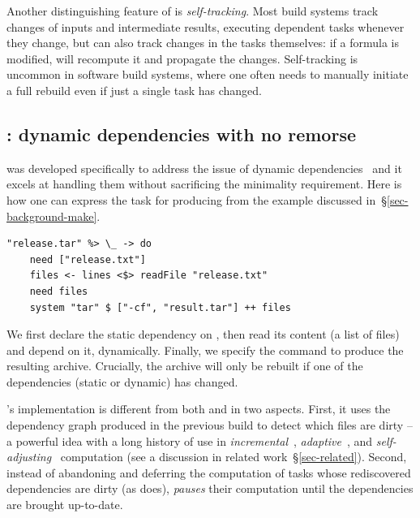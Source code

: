 Another distinguishing feature of \Excel is \emph{self-tracking}. Most build
systems track changes of inputs and intermediate results, executing dependent
tasks whenever they change, but \Excel can also track changes in the tasks
themselves: if a formula is modified, \Excel will recompute it and propagate
the changes. Self-tracking is uncommon in software build systems, where one
often needs to manually initiate a full rebuild even if just a single task has
changed.

\subsection{\Shake: dynamic dependencies with no remorse}
\label{sec-background-shake}

\Shake was developed specifically to address the issue of dynamic
dependencies~\cite{mitchell2012shake} and it excels at handling them without
sacrificing the minimality requirement. Here is how one can express the task
for producing  from the example discussed
in~\S\ref{sec-background-make}.

\vspace{1mm}
\begin{verbatim}
"release.tar" %> \_ -> do
    need ["release.txt"]
    files <- lines <$> readFile "release.txt"
    need files
    system "tar" $ ["-cf", "result.tar"] ++ files
\end{verbatim}
\vspace{1mm}

\noindent
We first declare the static dependency on , then read its
content (a list of files) and depend on it, dynamically. Finally, we specify the
command to produce the resulting archive. Crucially, the archive will only be
rebuilt if one of the dependencies (static or dynamic) has changed.

\Shake's implementation is different from both \Make and \Excel in two aspects.
First, it uses the dependency graph produced in the previous build to detect
which files are dirty -- a powerful idea with a long history of use in
\emph{incremental}~\cite{demers1981incremental},
\emph{adaptive}~\cite{acar2002adaptive}, and
\emph{self-adjusting}~\cite{acar2007selfadjusting} computation (see a discussion
in related work~\S\ref{sec-related}). Second, instead of abandoning and deferring
the computation of tasks whose rediscovered dependencies are dirty (as \Excel
does), \Shake \emph{pauses} their computation until the dependencies are
brought up-to-date.

